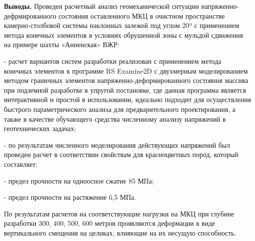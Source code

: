 {\bfseries Выводы.} Проведен расчетный анализ геомеханической ситуации
напряженно-дефрмированного состояния оставленного МКЦ в очистном
пространстве камерно-столбовой системы наклонных залежей под углом 20º с
применением метода конечных элементов в условиях обрушенной зоны с
мульдой сдвижения на примере шахты «Анненская» ВЖР:

- расчет вариантов систем разработки реализован с применением метода
конечных элементов в программе RS Examine2D с двухмерным моделированием
методом граничных элементов напряженно-деформированного состояния
массива при подземной разработке в упругой постановке, где данная
программа является интерактивной и простой в использовании, идеально
подходит для осуществления быстрого параметрического анализа для
предварительного проектирования, а также в качестве обучающего средства
численному анализу напряжений в геотехнических задачах;

- по результатам численного моделирования действующих напряжений был
проведен расчет в соответствии свойствам для красноцветных пород,
который составляет:

- предел прочности на одноосное сжатие 85 МПа;

- предел прочности на растяжение 6,5 МПа.

По результатам расчетов на соответствующие нагрузки на МКЦ при глубине
разработки 300, 400, 500, 600 метров проявляются деформации в виде
вертикального смещения на целиках, влияющие на их несущую способность.


